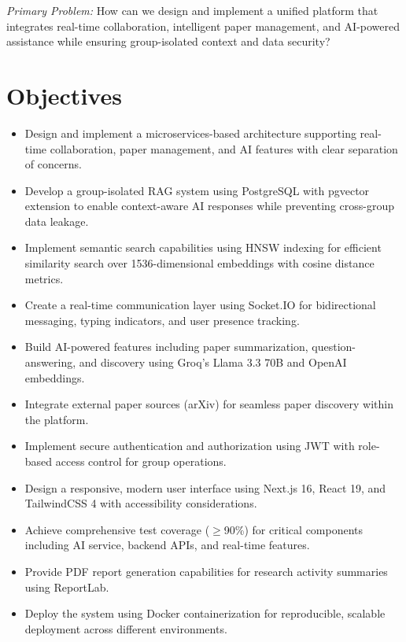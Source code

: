 \documentclass[12pt]{report}
\begin{document}
\textit{Primary Problem:} How can we design and implement a unified platform that integrates real-time collaboration, intelligent paper management, and AI-powered assistance while ensuring group-isolated context and data security?

\section{Objectives}

\begin{itemize}
    \item Design and implement a microservices-based architecture supporting real-time collaboration, paper management, and AI features with clear separation of concerns.
    
    \item Develop a group-isolated RAG system using PostgreSQL with pgvector extension to enable context-aware AI responses while preventing cross-group data leakage.
    
    \item Implement semantic search capabilities using HNSW indexing for efficient similarity search over 1536-dimensional embeddings with cosine distance metrics.
    
    \item Create a real-time communication layer using Socket.IO for bidirectional messaging, typing indicators, and user presence tracking.
    
    \item Build AI-powered features including paper summarization, question-answering, and discovery using Groq's Llama 3.3 70B and OpenAI embeddings.
    
    \item Integrate external paper sources (arXiv) for seamless paper discovery within the platform.
    
    \item Implement secure authentication and authorization using JWT with role-based access control for group operations.
    
    \item Design a responsive, modern user interface using Next.js 16, React 19, and TailwindCSS 4 with accessibility considerations.
    
    \item Achieve comprehensive test coverage ($\geq$90\%) for critical components including AI service, backend APIs, and real-time features.
    
    \item Provide PDF report generation capabilities for research activity summaries using ReportLab.
    
    \item Deploy the system using Docker containerization for reproducible, scalable deployment across different environments.
\end{itemize}
\end{document}
